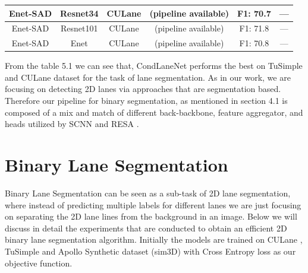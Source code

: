 \begin{table}[]
\begin{tabular}{|c|c|c|c|c|c|}
Enet-SAD          & Resnet34                                                            & CULane           & (pipeline available)                                                  & F1: 70.7                                                            & —                                                                                   \\ \hline
Enet-SAD          & Resnet101                                                           & CULane           & (pipeline available)                                                  & F1: 71.8                                                            & —                                                                                   \\ \hline
Enet-SAD          & Enet                                                                & CULane           & (pipeline available)                                                  & F1: 70.8                                                            & —                                                                                   \\ \hline
\end{tabular}
\end{table}
From the table 5.1 we can see that, CondLaneNet \cite{DBLP:journals/corr/abs-2105-05003} performs the best on TuSimple \cite{Tusimple} and CULane \cite{pan2018SCNN} dataset for the task of lane segmentation. As in our work, we are focusing on detecting 2D lanes via approaches that are segmentation based. Therefore our pipeline for binary segmentation, as mentioned in section 4.1 is composed of a mix and match of different back-backbone, feature aggregator, and heads utilized by SCNN \cite{pan2018SCNN} and RESA \cite{DBLP:journals/corr/abs-2008-13719}. 
    
    
    \section{Binary Lane Segmentation}
    Binary Lane Segmentation can be seen as a sub-task of 2D lane segmentation, where instead of predicting multiple labels for different lanes we are just focusing on separating the 2D lane lines from the background in an image. Below we will discuss in detail the experiments that are conducted to obtain an efficient 2D binary lane segmentation algorithm. Initially the models are trained on CULane \cite{pan2018SCNN}, TuSimple \cite{Tusimple} and Apollo Synthetic dataset (sim3D) \cite{guo2020gen} with Cross Entropy loss as our objective function. 
          
